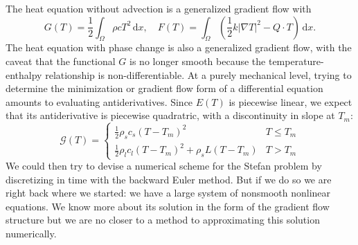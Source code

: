 \documentclass{article}
\theoremstyle{definition}
\theoremstyle{plain}
\newcommand{\ud}{\hspace{2pt}\mathrm{d}}
\begin{document}
The heat equation without advection is a generalized gradient flow with
\begin{equation}
    G(T) = \frac{1}{2}\int_\Omega \rho cT^2\ud x, \quad F(T) = \int_\Omega\left(\frac{1}{2}k|\nabla T|^2 - Q\cdot T\right)\ud x.
\end{equation}
The heat equation with phase change is also a generalized gradient flow, with the caveat that the functional $G$ is no longer smooth because the temperature-enthalpy relationship is non-differentiable.
At a purely mechanical level, trying to determine the minimization or gradient flow form of a differential equation amounts to evaluating antiderivatives.
Since $E(T)$ is piecewise linear, we expect that its antiderivative is piecewise quadratric, with a discontinuity in slope at $T_m$:
\begin{equation}
    \mathscr G(T) = \begin{cases}\frac{1}{2}\rho_sc_s(T - T_m)^2 & T \le T_m \\ \frac{1}{2}\rho_lc_l(T - T_m)^2 + \rho_sL(T - T_m) & T > T_m\end{cases}
\end{equation}
We could then try to devise a numerical scheme for the Stefan problem by discretizing in time with the backward Euler method.
But if we do so we are right back where we started: we have a large system of nonsmooth nonlinear equations.
We know more about its solution in the form of the gradient flow structure but we are no closer to a method to approximating this solution numerically.
\end{document}
